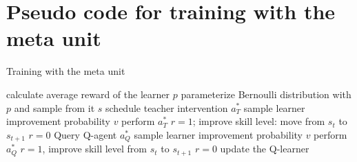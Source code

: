 \documentclass{article}
\begin{document}
\section{Pseudo code for training with the meta unit}
\label{code:meta}
\begin{algorithm}
\caption{Training with the meta unit}
\begin{algorithmic}[1]
\State calculate average reward of the learner \Return $p$
\State parameterize Bernoulli distribution with $p$  and sample from it \Return $s$ 
    \State schedule teacher intervention \Return $a^*_T$
    \State sample learner improvement probability \Return $v$
        \State perform  $a^*_T$
        \State \Return $r = 1$; improve skill level: move from $s_t$ to $s_{t+1}$
    \Else 
        \State \Return $r=0$
    \EndIf
\Else 
    \State Query Q-agent \Return  $a^*_Q$
    \State sample learner improvement probability \Return $v$
        \State perform $a^*_Q$
        \State \Return $r = 1$, improve skill level from $s_t$ to $s_{t+1}$
    \Else 
        \State \Return $r=0$
    \EndIf  
\EndIf
\State update the Q-learner
\end{algorithmic}
\end{algorithm}










\end{document}

